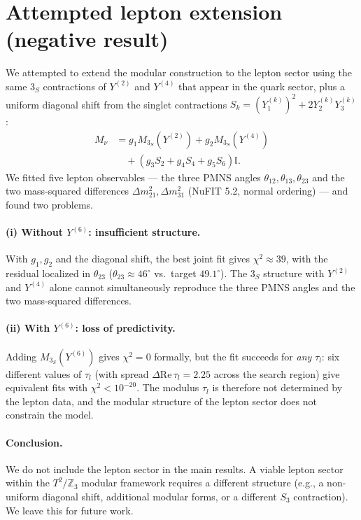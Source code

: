 \documentclass[12pt,a4paper]{article}
\numberwithin{equation}{section}
\begin{document}
\section{Attempted lepton extension (negative result)}
\label{sec:lepton_failed}
We attempted to extend the modular construction to the lepton sector
using the same \(3_S\) contractions of \(Y^{(2)}\) and \(Y^{(4)}\) that
appear in the quark sector, plus a uniform diagonal shift from the
singlet contractions
\(S_k = (Y_1^{(k)})^2 + 2 Y_2^{(k)} Y_3^{(k)}\):
\begin{equation}
\begin{split}
M_\nu &= g_1 M_{3_S}(Y^{(2)}) + g_2 M_{3_S}(Y^{(4)}) \\
&\quad + \left( g_3 S_2 + g_4 S_4 + g_5 S_6 \right) \mathbb{I}.
\end{split}
\end{equation}
We fitted five lepton observables --- the three PMNS angles
\(\theta_{12},\theta_{13},\theta_{23}\) and the two mass-squared
differences \(\Delta m^2_{21},\Delta m^2_{31}\) (NuFIT 5.2, normal
ordering) --- and found two problems.

\paragraph{(i) Without $Y^{(6)}$: insufficient structure.}
With \(g_1,g_2\) and the diagonal shift, the best joint fit gives
\(\chi^2 \approx 39\), with the residual localized in
\(\theta_{23}\) (\(\theta_{23} \approx 46^\circ\) vs.\ target
\(49.1^\circ\)). The \(3_S\) structure with \(Y^{(2)}\) and \(Y^{(4)}\)
alone cannot simultaneously reproduce the three PMNS angles and the
two mass-squared differences.

\paragraph{(ii) With $Y^{(6)}$: loss of predictivity.}
Adding \(M_{3_S}(Y^{(6)})\) gives \(\chi^2 = 0\) formally, but the fit
succeeds for \emph{any} \(\tau_l\): six different values of \(\tau_l\)
(with spread \(\Delta \mathrm{Re}\,\tau_l = 2.25\) across the search
region) give equivalent fits with \(\chi^2 < 10^{-20}\). The modulus
\(\tau_l\) is therefore not determined by the lepton data, and the
modular structure of the lepton sector does not constrain the model.

\paragraph{Conclusion.}
We do not include the lepton sector in the main results. A viable
lepton sector within the \(T^2/\mathbb{Z}_3\) modular framework
requires a different structure (e.g., a non-uniform diagonal shift,
additional modular forms, or a different \(S_3\) contraction).
We leave this for future work.
\end{document}
